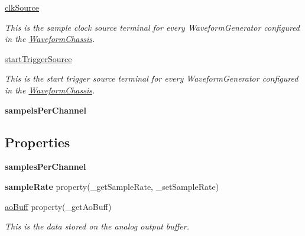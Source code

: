 \begin{DoxyCompactItemize}
\hyperlink{class_chassis_8git_1_1_waveform_chassis_1_1_w_c_low_level_af735d3b85e227e79f23d71376feded5c}{clk\-Source}
\begin{DoxyCompactList}\small\item\em This is the sample clock source terminal for every Waveform\-Generator configured in the \hyperlink{class_chassis_8git_1_1_waveform_chassis_1_1_waveform_chassis}{Waveform\-Chassis}. \end{DoxyCompactList}\item 
\hyperlink{class_chassis_8git_1_1_waveform_chassis_1_1_w_c_low_level_a54b88f1ab4328002a5c8745ec2cc8dec}{start\-Trigger\-Source}
\begin{DoxyCompactList}\small\item\em This is the start trigger source terminal for every Waveform\-Generator configured in the \hyperlink{class_chassis_8git_1_1_waveform_chassis_1_1_waveform_chassis}{Waveform\-Chassis}. \end{DoxyCompactList}\item 
\hypertarget{class_chassis_8git_1_1_waveform_chassis_1_1_w_c_low_level_a2e51aaf146b179b250af6b8c1374e9d2}{{\bfseries sampels\-Per\-Channel}}\label{class_chassis_8git_1_1_waveform_chassis_1_1_w_c_low_level_a2e51aaf146b179b250af6b8c1374e9d2}

\end{DoxyCompactItemize}
\subsection*{Properties}
\begin{DoxyCompactItemize}
\item 
{\bfseries samples\-Per\-Channel}
\item 
\hypertarget{class_chassis_8git_1_1_waveform_chassis_1_1_w_c_low_level_af48cd936b9ade9129495569c6c92a56f}{{\bfseries sample\-Rate} property(\-\_\-get\-Sample\-Rate, \-\_\-set\-Sample\-Rate)}\label{class_chassis_8git_1_1_waveform_chassis_1_1_w_c_low_level_af48cd936b9ade9129495569c6c92a56f}

\item 
\hyperlink{class_chassis_8git_1_1_waveform_chassis_1_1_w_c_low_level_afd1e6c5023de1afc7b6dcad30782e938}{ao\-Buff} property(\-\_\-get\-Ao\-Buff)
\begin{DoxyCompactList}\small\item\em This is the data stored on the analog output buffer. \end{DoxyCompactList}\end{DoxyCompactItemize}


